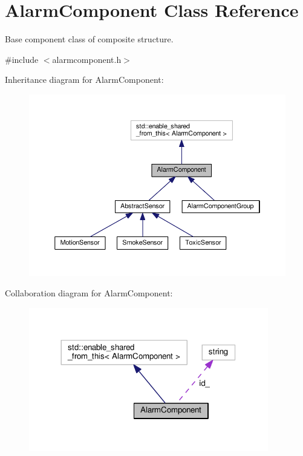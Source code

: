 \hypertarget{classAlarmComponent}{}\section{Alarm\+Component Class Reference}
\label{classAlarmComponent}


Base component class of composite structure.  




{\ttfamily \#include $<$alarmcomponent.\+h$>$}



Inheritance diagram for Alarm\+Component\+:
\nopagebreak
\begin{figure}[H]
\begin{center}
\leavevmode
\includegraphics[width=350pt]{classAlarmComponent__inherit__graph}
\end{center}
\end{figure}


Collaboration diagram for Alarm\+Component\+:
\nopagebreak
\begin{figure}[H]
\begin{center}
\leavevmode
\includegraphics[width=296pt]{classAlarmComponent__coll__graph}
\end{center}
\end{figure}
